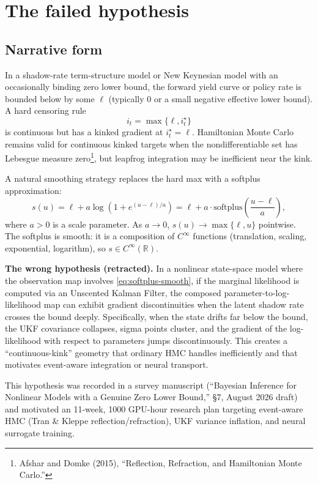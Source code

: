 \section{The failed hypothesis}

\subsection{Narrative form}

In a shadow-rate term-structure model or New Keynesian model with an occasionally binding zero lower bound, the forward yield curve or policy rate is bounded below by some $\ell$ (typically 0 or a small negative effective lower bound). A hard censoring rule
\begin{equation}\label{eq:hard-max}
i_t = \max\{\ell, i_t^\star\}
\end{equation}
is continuous but has a kinked gradient at $i_t^\star = \ell$. Hamiltonian Monte Carlo remains valid for continuous kinked targets when the nondifferentiable set has Lebesgue measure zero\footnote{Afshar and Domke (2015), ``Reflection, Refraction, and Hamiltonian Monte Carlo.''}, but leapfrog integration may be inefficient near the kink.

A natural smoothing strategy replaces the hard max with a softplus approximation:
\begin{equation}\label{eq:softplus-smooth}
s(u) = \ell + a \log(1 + e^{(u-\ell)/a}) = \ell + a \cdot \mathrm{softplus}\left(\frac{u-\ell}{a}\right),
\end{equation}
where $a > 0$ is a scale parameter. As $a \to 0$, $s(u) \to \max\{\ell, u\}$ pointwise. The softplus is smooth: it is a composition of $C^\infty$ functions (translation, scaling, exponential, logarithm), so $s \in C^\infty(\mathbb{R})$.

\textbf{The wrong hypothesis (retracted).} In a nonlinear state-space model where the observation map involves \eqref{eq:softplus-smooth}, if the marginal likelihood is computed via an Unscented Kalman Filter, the composed parameter-to-log-likelihood map can exhibit gradient discontinuities when the latent shadow rate crosses the bound deeply. Specifically, when the state drifts far below the bound, the UKF covariance collapses, sigma points cluster, and the gradient of the log-likelihood with respect to parameters jumps discontinuously. This creates a ``continuous-kink'' geometry that ordinary HMC handles inefficiently and that motivates event-aware integration or neural transport.

This hypothesis was recorded in a survey manuscript (``Bayesian Inference for Nonlinear Models with a Genuine Zero Lower Bound,'' §7, August 2026 draft) and motivated an 11-week, 1000 GPU-hour research plan targeting event-aware HMC (Tran \& Kleppe reflection/refraction), UKF variance inflation, and neural surrogate training.

